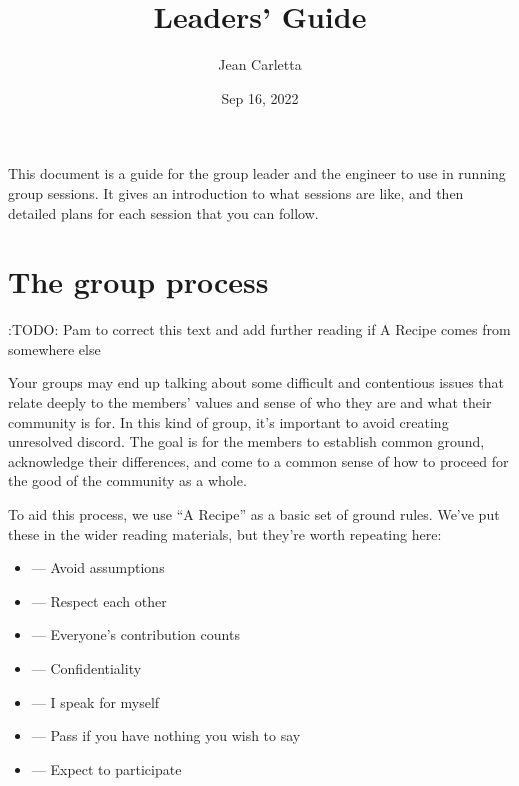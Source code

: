 \documentclass[letterpaper,10pt,english]{jupyterBook}
\title{Leaders' Guide}
\date{Sep 16, 2022}
\author{Jean Carletta}
\begin{document}
\pagestyle{empty}
\sphinxmaketitle
\pagestyle{plain}
\sphinxtableofcontents
\pagestyle{normal}
\label{\detokenize{intro::doc}}


\sphinxAtStartPar
This document is a guide for the group leader and the engineer to use in running group sessions.  It gives an introduction to what sessions are like, and then detailed plans for each session that you can follow.

\sphinxstepscope


\chapter{The group process}
\label{\detokenize{group-process:the-group-process}}\label{\detokenize{group-process::doc}}
\sphinxAtStartPar
:TODO: Pam to correct this text and add further reading if A Recipe comes from somewhere else

\sphinxAtStartPar
Your groups may end up talking about some difficult and contentious issues that relate deeply to the members’ values and sense of who they are and what their community is for.  In this kind of group, it’s important to avoid creating unresolved discord.  The goal is for the members to establish common ground, acknowledge their differences,  and come to a common sense of how to proceed for the good of the community as a whole.

\sphinxAtStartPar
To aid this process, we use “A Recipe” as a basic set of ground rules. We’ve put these in the wider reading materials, but they’re worth repeating here:
\begin{itemize}
\item {} 
\sphinxAtStartPar
{} — Avoid assumptions

\item {} 
\sphinxAtStartPar
{} — Respect each other

\item {} 
\sphinxAtStartPar
{} — Everyone’s contribution counts

\item {} 
\sphinxAtStartPar
{} — Confidentiality

\item {} 
\sphinxAtStartPar
{} — I speak for myself

\item {} 
\sphinxAtStartPar
{} — Pass if you have nothing you wish to say

\item {} 
\sphinxAtStartPar
{} — Expect to participate

\end{itemize}
\end{document}

